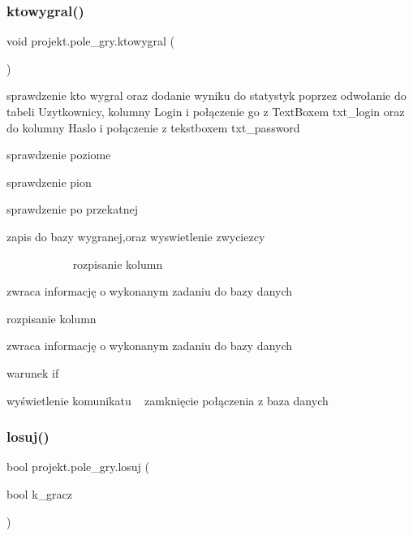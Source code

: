\subsubsection{\texorpdfstring{ktowygral()}{ktowygral()}}
{\footnotesize\ttfamily void projekt.\+pole\+\_\+gry.\+ktowygral (\begin{DoxyParamCaption}{ }\end{DoxyParamCaption})\hspace{0.3cm}{\ttfamily [inline]}}



sprawdzenie kto wygral oraz dodanie wyniku do statystyk poprzez odwołanie do tabeli Uzytkownicy, kolumny Login i połączenie go z Text\+Boxem txt\+\_\+login oraz do kolumny Haslo i połączenie z tekstboxem txt\+\_\+password 

sprawdzenie poziome

sprawdzenie pion

sprawdzenie po przekatnej

zapis do bazy wygranej,oraz wyswietlenie zwyciezcy 

~\newline
~\newline
~\newline
~\newline
~\newline
~\newline
~\newline
 rozpisanie kolumn

zwraca informację o wykonanym zadaniu do bazy danych

rozpisanie kolumn

zwraca informację o wykonanym zadaniu do bazy danych

warunek if

wyświetlenie komunikatu ~\newline
 zamknięcie połączenia z baza danych \mbox{\label{classprojekt_1_1pole__gry_aeb3b718227f0dd6c91ed8dc97213b703}} 
\subsubsection{\texorpdfstring{losuj()}{losuj()}}
{\footnotesize\ttfamily bool projekt.\+pole\+\_\+gry.\+losuj (\begin{DoxyParamCaption}\item[{bool}]{k\+\_\+gracz }\end{DoxyParamCaption})\hspace{0.3cm}{\ttfamily [inline]}}




